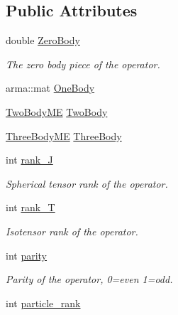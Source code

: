 \subsection*{Public Attributes}
\begin{DoxyCompactItemize}
\item 
\hypertarget{classOperator_a2f9f1109333a2485083cc7c090f9cd26}{double \hyperlink{classOperator_a2f9f1109333a2485083cc7c090f9cd26}{Zero\-Body}}\label{classOperator_a2f9f1109333a2485083cc7c090f9cd26}

\begin{DoxyCompactList}\small\item\em The zero body piece of the operator. \end{DoxyCompactList}\item 
arma\-::mat \hyperlink{classOperator_a14b1c78e0be45772aa57168c74d1b57c}{One\-Body}
\item 
\hyperlink{classTwoBodyME}{Two\-Body\-M\-E} \hyperlink{classOperator_add51ac69970faff9936192fec4181e00}{Two\-Body}
\item 
\hyperlink{classThreeBodyME}{Three\-Body\-M\-E} \hyperlink{classOperator_ac9d7e28ec1958d5065e12cbf0c0e3541}{Three\-Body}
\item 
\hypertarget{classOperator_a71a7c194800e2758c42ad0d5f30299aa}{int \hyperlink{classOperator_a71a7c194800e2758c42ad0d5f30299aa}{rank\-\_\-\-J}}\label{classOperator_a71a7c194800e2758c42ad0d5f30299aa}

\begin{DoxyCompactList}\small\item\em Spherical tensor rank of the operator. \end{DoxyCompactList}\item 
\hypertarget{classOperator_ac70ee8dbbc4cb4f61972575c68bb9a51}{int \hyperlink{classOperator_ac70ee8dbbc4cb4f61972575c68bb9a51}{rank\-\_\-\-T}}\label{classOperator_ac70ee8dbbc4cb4f61972575c68bb9a51}

\begin{DoxyCompactList}\small\item\em Isotensor rank of the operator. \end{DoxyCompactList}\item 
\hypertarget{classOperator_ad628e91e2dd2542c0f34e985271adcd3}{int \hyperlink{classOperator_ad628e91e2dd2542c0f34e985271adcd3}{parity}}\label{classOperator_ad628e91e2dd2542c0f34e985271adcd3}

\begin{DoxyCompactList}\small\item\em Parity of the operator, 0=even 1=odd. \end{DoxyCompactList}\item 
\hypertarget{classOperator_a44a74c03caff49e776433e885a724956}{int \hyperlink{classOperator_a44a74c03caff49e776433e885a724956}{particle\-\_\-rank}}\label{classOperator_a44a74c03caff49e776433e885a724956}


\end{DoxyCompactItemize}
